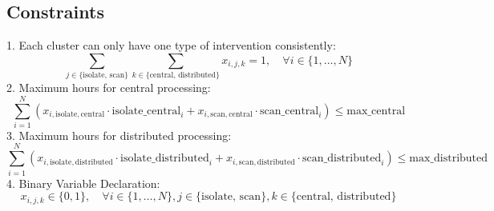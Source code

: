 \documentclass{article}
\begin{document}
\subsection*{Constraints}
1. Each cluster can only have one type of intervention consistently:
\[
\sum_{j \in \{\text{isolate, scan}\}} \sum_{k \in \{\text{central, distributed}\}} x_{i,j,k} = 1, \quad \forall i \in \{1, \ldots, N\}
\]
2. Maximum hours for central processing:
\[
\sum_{i=1}^{N} \left( x_{i, \text{isolate}, \text{central}} \cdot \text{isolate\_central}_i + x_{i, \text{scan}, \text{central}} \cdot \text{scan\_central}_i \right) \leq \text{max\_central}
\]
3. Maximum hours for distributed processing:
\[
\sum_{i=1}^{N} \left( x_{i, \text{isolate}, \text{distributed}} \cdot \text{isolate\_distributed}_i + x_{i, \text{scan}, \text{distributed}} \cdot \text{scan\_distributed}_i \right) \leq \text{max\_distributed}
\]
4. Binary Variable Declaration:
\[
x_{i,j,k} \in \{0, 1\}, \quad \forall i \in \{1, \ldots, N\}, j \in \{\text{isolate, scan}\}, k \in \{\text{central, distributed}\}
\]
\end{document}
